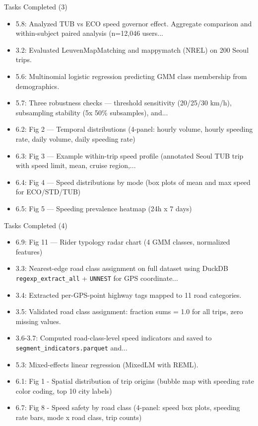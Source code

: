\documentclass[aspectratio=169, 10pt]{beamer}
\begin{document}
\begin{frame}{Tasks Completed (3)}
\begin{itemize}\small
  \item 5.8: Analyzed TUB vs ECO speed governor effect. Aggregate comparison and within-subject paired analysis (n=12,046 users...
  \item 3.2: Evaluated LeuvenMapMatching and mappymatch (NREL) on 200 Seoul trips.
  \item 5.6: Multinomial logistic regression predicting GMM class membership from demographics.
  \item 5.7: Three robustness checks — threshold sensitivity (20/25/30 km/h), subsampling stability (5x 50\% subsamples), and...
  \item 6.2: Fig 2 — Temporal distributions (4-panel: hourly volume, hourly speeding rate, daily volume, daily speeding rate)
  \item 6.3: Fig 3 — Example within-trip speed profile (annotated Seoul TUB trip with speed limit, mean, cruise region,...
  \item 6.4: Fig 4 — Speed distributions by mode (box plots of mean and max speed for ECO/STD/TUB)
  \item 6.5: Fig 5 — Speeding prevalence heatmap (24h x 7 days)
\end{itemize}
\end{frame}

\begin{frame}{Tasks Completed (4)}
\begin{itemize}\small
  \item 6.9: Fig 11 — Rider typology radar chart (4 GMM classes, normalized features)
  \item 3.3: Nearest-edge road class assignment on full dataset using DuckDB \texttt{regexp\_extract\_all} + \texttt{UNNEST} for GPS coordinate...
  \item 3.4: Extracted per-GPS-point highway tags mapped to 11 road categories.
  \item 3.5: Validated road class assignment: fraction sums = 1.0 for all trips, zero missing values.
  \item 3.6-3.7: Computed road-class-level speed indicators and saved to \texttt{segment\_indicators.parquet} and...
  \item 5.3: Mixed-effects linear regression (MixedLM with REML).
  \item 6.1: Fig 1 - Spatial distribution of trip origins (bubble map with speeding rate color coding, top 10 city labels)
  \item 6.7: Fig 8 - Speed safety by road class (4-panel: speed box plots, speeding rate bars, mode x road class, trip counts)
\end{itemize}
\end{frame}
\end{document}
